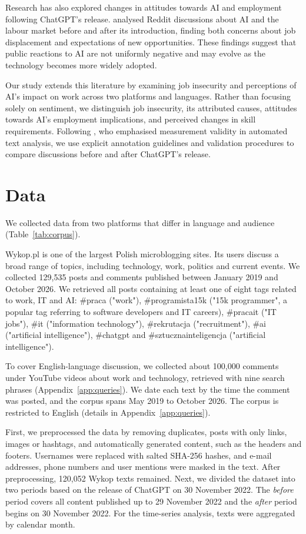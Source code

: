 \documentclass[11pt]{article}
\begin{document}
Research has also explored changes in attitudes towards AI and employment following ChatGPT's release. \citet{fodor2026} analysed Reddit discussions about AI and the labour market before and after its introduction, finding both concerns about job displacement and expectations of new opportunities. These findings suggest that public reactions to AI are not uniformly negative and may evolve as the technology becomes more widely adopted.

Our study extends this literature by examining job insecurity and perceptions of AI's impact on work across two platforms and languages. Rather than focusing solely on sentiment, we distinguish job insecurity, its attributed causes, attitudes towards AI's employment implications, and perceived changes in skill requirements. Following \citet{grimmer2013}, who emphasised measurement validity in automated text analysis, we use explicit annotation guidelines and validation procedures to compare discussions before and after ChatGPT's release.
\section{Data}

We collected data from two platforms that differ in language and audience (Table~\ref{tab:corpus}).

Wykop.pl is one of the largest Polish microblogging sites. Its users discuss a broad range of topics, including technology, work, politics and current events. We collected 129,535 posts and comments published between January 2019 and October 2026. We retrieved all posts containing at least one of eight tags related to work, IT and AI: \#praca ("work"), \#programista15k ("15k programmer", a popular tag referring to software developers and IT careers), \#pracait ("IT jobs"), \#it ("information technology"), \#rekrutacja ("recruitment"), \#ai ("artificial intelligence"), \#chatgpt and \#sztucznainteligencja ("artificial intelligence").

To cover English-language discussion, we collected about 100,000 comments under YouTube videos about work and technology, retrieved with nine search phrases (Appendix~\ref{app:queries}). We date each text by the time the comment was posted, and the corpus spans May 2019 to October 2026. The corpus is restricted to English (details in Appendix~\ref{app:queries}).

First, we preprocessed the data by removing duplicates, posts with only links, images or hashtags, and automatically generated content, such as the headers and footers. Usernames were replaced with salted SHA-256 hashes, and e-mail addresses, phone numbers and user mentions were masked in the text. After preprocessing, 120,052 Wykop texts remained. Next, we divided the dataset into two periods based on the release of ChatGPT on 30 November 2022. The \textit{before} period covers all content published up to 29 November 2022 and the \textit{after} period begins on 30 November 2022. For the time-series analysis, texts were aggregated by calendar month.
\end{document}
